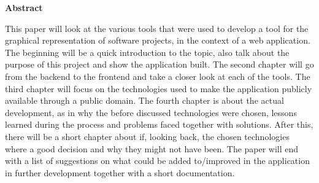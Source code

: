 \newpage

\vspace*{1cm}

\begin{center}
    \textbf{Abstract}
\end{center}

\vspace*{1cm}

\noindent
This paper will look at the various tools that were used to develop a tool for the graphical representation of software projects, in the context of a web application. The beginning will be a quick introduction to the topic, also talk about the purpose of this project and show the application built. The second chapter will go from the backend to the frontend and take a closer look at each of the tools. The third chapter will focus on the technologies used to make the application publicly available through a public domain. The fourth chapter is about the actual development, as in why the before discussed technologies were chosen, lessons learned during the process and problems faced together with solutions. After this, there will be a short chapter about if, looking back, the chosen technologies where a good decision and why they might not have been. The paper will end with a list of suggestions on what could be added to/improved in the application in further development together with a short documentation.
